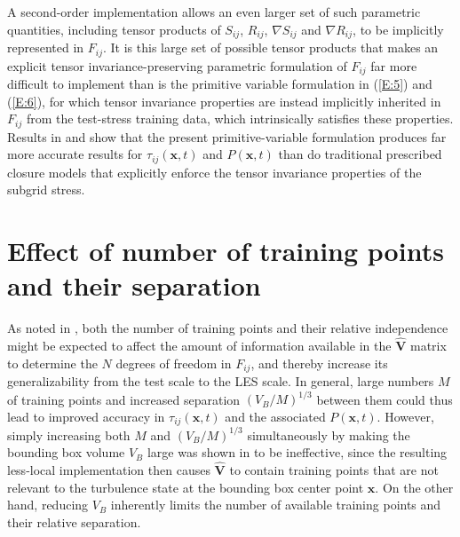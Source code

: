 A second-order implementation allows an even larger set of such parametric quantities, including tensor products of $S_{ij}$, $R_{ij}$,  $\nabla S_{ij}$ and $\nabla R_{ij}$, to be implicitly represented in $F_{ij}$. It is this large set of possible tensor products that makes an explicit tensor invariance-preserving parametric formulation of  $F_{ij}$ far more difficult to implement than is the primitive variable formulation in (\ref{E:5}) and (\ref{E:6}), for which tensor invariance properties are instead implicitly inherited in $F_{ij}$  from the test-stress training data, which intrinsically satisfies these properties. Results in  and  show that the present primitive-variable formulation produces far more accurate results for  $\tau_{ij}(\mathbf{x},t)$ and $P(\mathbf{x},t)$  than do traditional prescribed closure models that explicitly enforce the tensor invariance properties of the subgrid stress.

\section{Effect of number of training points and their separation}
\label{sec:IVE}

As noted in , both the number of training points and their relative independence might be expected to affect the amount of information available in the $\widehat{\mathbf{V}}$  matrix to determine the $N$ degrees of freedom in $F_{ij}$, and thereby increase its generalizability from the test scale to the LES scale. In general, large numbers $M$ of training points and increased separation $(V_B/M)^{1/3}$  between them could thus lead to improved accuracy in $\tau_{ij}(\mathbf{x},t)$  and the associated  $P(\mathbf{x},t)$. However, simply increasing both $M$ and $(V_B/M)^{1/3}$  simultaneously by making the bounding box volume  $V_B$ large was shown in  to be ineffective, since the resulting less-local implementation then causes $\widehat{\mathbf{V}}$ to contain training points that are not relevant to the turbulence state at the bounding box center point $\mathbf{x}$. On the other hand, reducing  $V_B$ inherently limits the number of available training points and their relative separation. 

